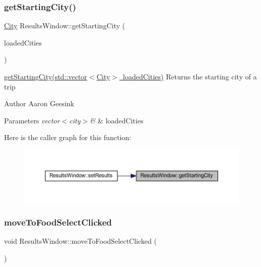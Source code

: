 \subsubsection{\texorpdfstring{getStartingCity()}{getStartingCity()}}
{\footnotesize\ttfamily \mbox{\hyperlink{class_city}{City}} Results\+Window\+::get\+Starting\+City (\begin{DoxyParamCaption}\item[{std\+::vector$<$ \mbox{\hyperlink{class_city}{City}} $>$}]{loaded\+Cities }\end{DoxyParamCaption})}



\mbox{\hyperlink{class_results_window_ae9d02be8b007fcbc61f6d6536ba1520f}{get\+Starting\+City(std\+::vector$<$\+City$>$ loaded\+Cities)}} Returns the starting city of a trip 

\begin{DoxyAuthor}{Author}
Aaron Geesink 
\end{DoxyAuthor}

\begin{DoxyParams}{Parameters}
{\em vector$<$city$>$\&} & loaded\+Cities \\
\hline
\end{DoxyParams}
Here is the caller graph for this function\+:
\nopagebreak
\begin{figure}[H]
\begin{center}
\leavevmode
\includegraphics[width=350pt]{class_results_window_ae9d02be8b007fcbc61f6d6536ba1520f_icgraph}
\end{center}
\end{figure}
\mbox{\label{class_results_window_a7a545927d8dd85526646a5d05d758052}} 
\subsubsection{\texorpdfstring{moveToFoodSelectClicked}{moveToFoodSelectClicked}}
{\footnotesize\ttfamily void Results\+Window\+::move\+To\+Food\+Select\+Clicked (\begin{DoxyParamCaption}{ }\end{DoxyParamCaption})\hspace{0.3cm}{\ttfamily [signal]}}



